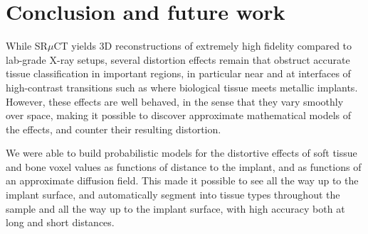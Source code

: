 \documentclass[pdflatex,sn-mathphys]{sn-jnl}%
\theoremstyle{thmstyleone}%
\theoremstyle{thmstyletwo}%
\theoremstyle{thmstylethree}%
\begin{document}




\section{Conclusion and future work}
\label{sec:conclusion}

While SR$\mu$CT yields 3D reconstructions of extremely high fidelity compared to lab-grade X-ray setups,
several distortion effects remain that obstruct accurate tissue classification in important regions, in particular
near and at interfaces of high-contrast transitions such as where biological tissue meets metallic implants.
However, these effects are well behaved, in the sense that they vary smoothly over space, making it possible
to discover approximate mathematical models of the effects, and counter their resulting distortion.

We were able to build probabilistic models for the distortive effects
of soft tissue and bone voxel values as functions of distance to the
implant, and as functions of an approximate diffusion field. This made
it possible to see all the way up to the implant surface, and
automatically segment into tissue types throughout the sample and all
the way up to the implant surface, with high accuracy both at long and
short distances.
\end{document}
